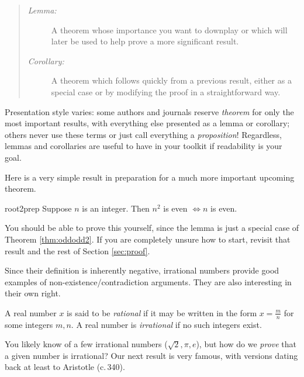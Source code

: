 \begin{quote}
	\begin{description}
	  \item[\normalfont\emph{Lemma:}] A theorem whose importance you want to downplay or which will later be used to help prove a more significant result. 
	  \item[\normalfont\emph{Corollary:}] A theorem which follows quickly from a previous result, either as a special case or by modifying the proof in a straightforward way.
	\end{description}
\end{quote}

Presentation style varies: some authors and journals reserve \emph{theorem} for only the most important results, with everything else presented as a lemma or corollary; others never use these terms or just call everything a \emph{proposition}! Regardless, lemmas and corollaries are useful to have in your toolkit if readability is your goal.\medbreak
 
 
Here is a very simple result in preparation for a much more important upcoming theorem.

\begin{lemm}{}{root2prep}
	Suppose $n$ is an integer. Then $n^2$ is even $\Longleftrightarrow n$ is even.
\end{lemm}

You should be able to prove this yourself, since the lemma is just a special case of Theorem \ref{thm:oddodd2}. If you are completely unsure how to start, revisit that result and the rest of Section \ref{sec:proof}.
 



Since their definition is inherently negative, irrational numbers provide good examples of non-existence/contradiction arguments. They are also interesting in their own right.

\begin{defn}{}{}
	A real number $x$ is said to be \emph{rational} if it may be written in the form $x=\frac mn$ for some integers $m,n$. A real number is \emph{irrational} if no such integers exist.
\end{defn}
 
You likely know of a few irrational numbers ($\sqrt 2,\pi,e$), but how do we \emph{prove} that a given number is irrational? Our next result is very famous, with versions dating back at least to Aristotle (c.\,340\BCE). 

